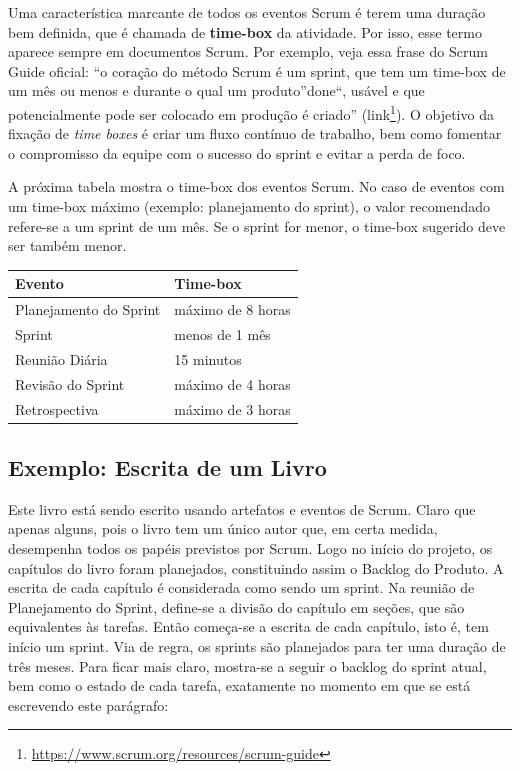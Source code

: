 \documentclass[
  11pt,
  twoside]{book}
\DeclareRobustCommand{\href}[2]{#2\footnote{\url{#1}}}
\begin{document}
 

Uma característica marcante de todos os eventos Scrum é terem uma
duração bem definida, que é chamada de \textbf{time-box} da atividade.
Por isso, esse termo aparece sempre em documentos Scrum. Por exemplo,
veja essa frase do Scrum Guide oficial: ``o coração do método Scrum é um
sprint, que tem um time-box de um mês ou menos e durante o qual um
produto''done``, usável e que potencialmente pode ser colocado em
produção é criado''
(\href{https://www.scrum.org/resources/scrum-guide}{link}). O objetivo
da fixação de \emph{time boxes} é criar um fluxo contínuo de trabalho,
bem como fomentar o compromisso da equipe com o sucesso do sprint e
evitar a perda de foco.

A próxima tabela mostra o time-box dos eventos Scrum. No caso de eventos
com um time-box máximo (exemplo: planejamento do sprint), o valor
recomendado refere-se a um sprint de um mês. Se o sprint for menor, o
time-box sugerido deve ser também menor.

\begin{longtable}[]{@{}ll@{}}
\toprule
\textbf{Evento} & \textbf{Time-box}\tabularnewline
\midrule
\endhead
Planejamento do Sprint & máximo de 8 horas\tabularnewline
Sprint & menos de 1 mês\tabularnewline
Reunião Diária & 15 minutos\tabularnewline
Revisão do Sprint & máximo de 4 horas\tabularnewline
Retrospectiva & máximo de 3 horas\tabularnewline
\bottomrule
\end{longtable}

\hypertarget{exemplo-escrita-de-um-livro}{%
\subsection{Exemplo: Escrita de um
Livro}\label{exemplo-escrita-de-um-livro}}

Este livro está sendo escrito usando artefatos e eventos de Scrum. Claro
que apenas alguns, pois o livro tem um único autor que, em certa medida,
desempenha todos os papéis previstos por Scrum. Logo no início do
projeto, os capítulos do livro foram planejados, constituindo assim o
Backlog do Produto. A escrita de cada capítulo é considerada como sendo
um sprint. Na reunião de Planejamento do Sprint, define-se a divisão do
capítulo em seções, que são equivalentes às tarefas. Então começa-se a
escrita de cada capítulo, isto é, tem início um sprint. Via de regra, os
sprints são planejados para ter uma duração de três meses. Para ficar
mais claro, mostra-se a seguir o backlog do sprint atual, bem como o
estado de cada tarefa, exatamente no momento em que se está escrevendo
este parágrafo:
\end{document}

